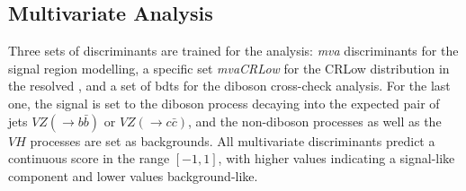 \subsection{Multivariate Analysis}
Three sets of discriminants are trained for the analysis: \textit{\gls{mva}} discriminants for the signal region modelling, a specific set \textit{mvaCRLow} for the CRLow distribution in the resolved \vhb, and a set of \glspl{bdt} for the diboson cross-check analysis. For the last one, the signal is set to the diboson process decaying into the expected pair of jets $VZ(\rightarrow b\bar{b})$ or $VZ(\rightarrow c\bar{c})$, and the non-diboson processes as well as the $VH$ processes are set as backgrounds. All multivariate discriminants predict a continuous score in the range $[-1, 1]$, with higher values indicating a signal-like component and lower values background-like.\\

